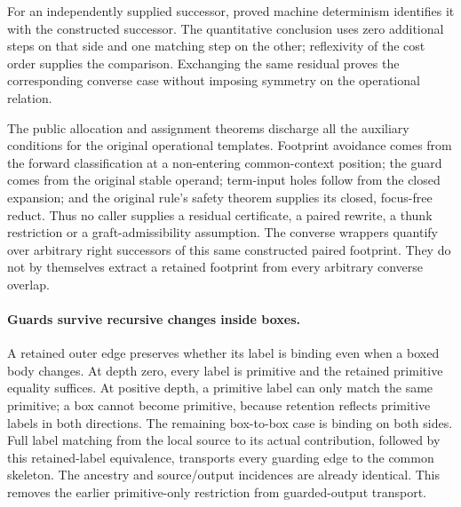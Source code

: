 For an independently supplied successor, proved machine determinism
identifies it with the constructed successor. The quantitative conclusion
uses zero additional steps on that side and one matching step on the other;
reflexivity of the cost order supplies the comparison. Exchanging the same
residual proves the corresponding converse case without imposing symmetry
on the operational relation.


The public allocation and assignment theorems discharge all the auxiliary
conditions for the original operational templates. Footprint avoidance comes
from the forward classification at a non-entering common-context position;
the guard comes from the original stable operand; term-input holes follow
from the closed expansion; and the original rule's safety theorem supplies
its closed, focus-free reduct. Thus no caller supplies a residual certificate,
a paired rewrite, a thunk restriction or a graft-admissibility assumption.
The converse wrappers quantify over arbitrary right successors of this same
constructed paired footprint. They do not by themselves extract a retained
footprint from every arbitrary converse overlap.


\paragraph{Guards survive recursive changes inside boxes.}
A retained outer edge preserves whether its label is binding even when a
boxed body changes. At depth zero, every label is primitive and the retained
primitive equality suffices. At positive depth, a primitive label can only
match the same primitive; a box cannot become primitive, because retention
reflects primitive labels in both directions. The remaining box-to-box case
is binding on both sides. Full label matching from the local source to its
actual contribution, followed by this retained-label equivalence, transports
every guarding edge to the common skeleton. The ancestry and source/output
incidences are already identical. This removes the earlier primitive-only
restriction from guarded-output transport.

